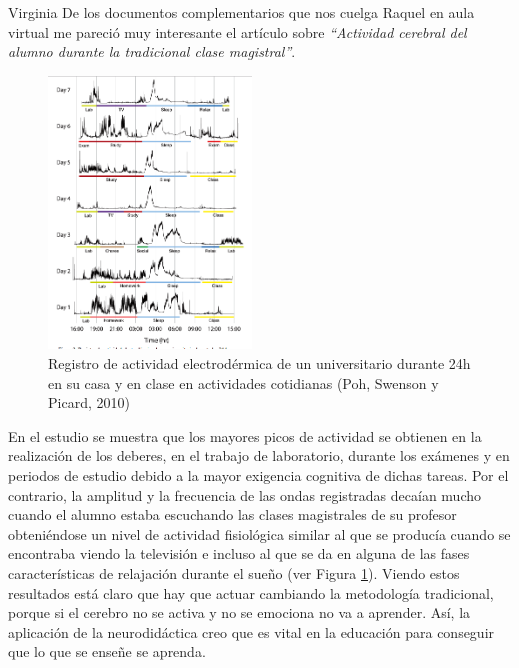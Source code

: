 \begin{opin}{\virgicolor}{Virginia}
De los documentos complementarios que nos cuelga Raquel en aula virtual me pareció muy interesante el artículo sobre \textit{“Actividad cerebral del alumno durante la tradicional clase magistral”}.
%
\begin{figure}
  \begin{center}
    \includegraphics[width=0.48\textwidth]{img/viryi3.png}
  \end{center}
  \caption{Registro de actividad electrodérmica de un universitario durante 24h en su casa y en clase en actividades cotidianas (Poh, Swenson y Picard, 2010)}
\label{estudiomolon}
\end{figure}
%
En el estudio se muestra que los mayores picos de actividad se obtienen en la realización de los deberes, en el trabajo de laboratorio, durante los exámenes y en periodos de estudio debido a la mayor exigencia cognitiva de dichas tareas. Por el contrario, la amplitud y la frecuencia de las ondas registradas decaían mucho cuando el alumno estaba escuchando las clases magistrales de su profesor obteniéndose un nivel de actividad fisiológica similar al que se producía cuando se encontraba viendo la televisión e incluso al que se da en alguna de las fases características de relajación durante el sueño (ver Figura \ref{estudiomolon}). Viendo estos resultados está claro que hay que actuar cambiando la metodología tradicional, porque si el cerebro no se activa y no se emociona no va a aprender. Así, la aplicación de la neurodidáctica creo que es vital en la educación para conseguir que lo que se enseñe se aprenda.





\end{opin}
